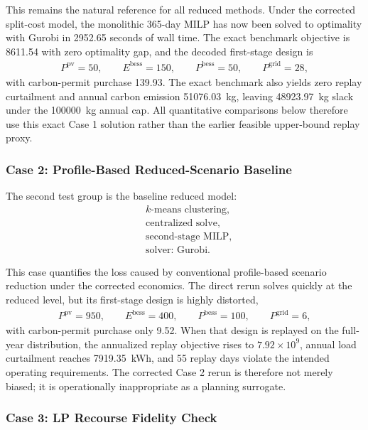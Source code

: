This remains the natural reference for all reduced methods. Under the corrected split-cost model, the monolithic 365-day MILP has now been solved to optimality with Gurobi in 2952.65 seconds of wall time. The exact benchmark objective is 8611.54 with zero optimality gap, and the decoded first-stage design is
\begin{align}
P^{\mathrm{pv}}=50,\qquad E^{\mathrm{bess}}=150,\qquad P^{\mathrm{bess}}=50,\qquad P^{\mathrm{grid}}=28,
\end{align}
with carbon-permit purchase 139.93. The exact benchmark also yields zero replay curtailment and annual carbon emission 51076.03~kg, leaving 48923.97~kg slack under the 100000~kg annual cap. All quantitative comparisons below therefore use this exact Case 1 solution rather than the earlier feasible upper-bound replay proxy.

\subsubsection{Case 2: Profile-Based Reduced-Scenario Baseline}

The second test group is the baseline reduced model:
\begin{align}
& \text{$k$-means clustering}, \\
& \text{centralized solve}, \\
& \text{second-stage MILP}, \\
& \text{solver: Gurobi}.
\end{align}

This case quantifies the loss caused by conventional profile-based scenario reduction under the corrected economics. The direct rerun solves quickly at the reduced level, but its first-stage design is highly distorted,
\begin{align}
P^{\mathrm{pv}}=950,\qquad E^{\mathrm{bess}}=400,\qquad P^{\mathrm{bess}}=100,\qquad P^{\mathrm{grid}}=6,
\end{align}
with carbon-permit purchase only 9.52. When that design is replayed on the full-year distribution, the annualized replay objective rises to $7.92\times 10^9$, annual load curtailment reaches 7919.35~kWh, and 55 replay days violate the intended operating requirements. The corrected Case 2 rerun is therefore not merely biased; it is operationally inappropriate as a planning surrogate.

\subsubsection{Case 3: LP Recourse Fidelity Check}

